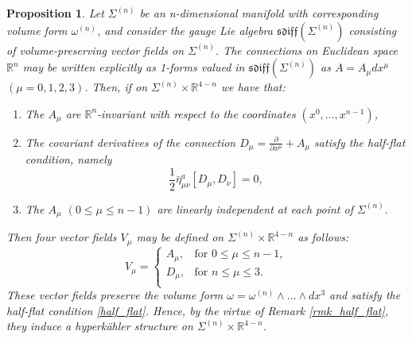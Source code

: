 \documentclass[a4paper,onecolumn,12pt]{article}
\newtheorem{prop}[thm]{Proposition}
\theoremstyle{definition}
\theoremstyle{remark}
\newcommand{\ddxm}{\frac{\partial}{\partial x^{\mu}}}
\newcommand{\HK}{hyperk\"ahler }
\newcommand{\R}{\mathbb{R}}
\newcommand{\hooft}{\bar{\eta}}
\begin{document}
\begin{prop}
	Let $\Sigma^{(n)}$ be an n-dimensional manifold with corresponding volume form $\omega^{(n)}$, and consider the gauge Lie algebra $\mathfrak{sdiff}(\Sigma^{(n)})$ consisting of volume-preserving vector fields on $\Sigma^{(n)}$. The connections on Euclidean space $\R^{n}$ may be written explicitly as 1-forms valued in $\mathfrak{sdiff}(\Sigma^{(n)})$ as $A=A_{\mu}dx^{\mu}$ $(\mu=0,1,2,3)$.
	Then, if on $\Sigma^{(n)}\times \R^{4-n}$ we have that:
	\begin{enumerate}
		\item The $A_{\mu}$ are $\R^{n}$-invariant with respect to the coordinates $(x^{0},...,x^{n-1})$,
		
		\item The covariant derivatives of the connection $D_{\mu} = \ddxm + A_{\mu}$ satisfy the half-flat condition, namely
		$$
		\frac{1}{2}\hooft^{a}_{\mu\nu}[D_{\mu},D_{\nu}] = 0,
		$$
		\item The $A_{\mu}$ $(0 \leq \mu \leq n-1)$ are linearly independent at each point of $\Sigma^{(n)}.$
	\end{enumerate}
	Then four vector fields $V_{\mu}$ may be defined on $\Sigma^{(n)}\times \R^{4-n}$ as follows:
	\[
	V_{\mu}= 
	\begin{cases}
	A_{\mu},& \text{for } 0 \leq \mu \leq n-1,\\
	D_{\mu},& \text{for } n \leq \mu \leq 3.\\
	\end{cases}
	\]
	These vector fields preserve the volume form $\omega = \omega^{(n)}\wedge...\wedge dx^{3}$ and satisfy the half-flat condition \ref{half_flat}. Hence, by the virtue of Remark \ref{rmk_half_flat}, they induce a \HK structure on $\Sigma^{(n)}\times \R^{4-n}$.\\
\end{prop}
\end{document}
